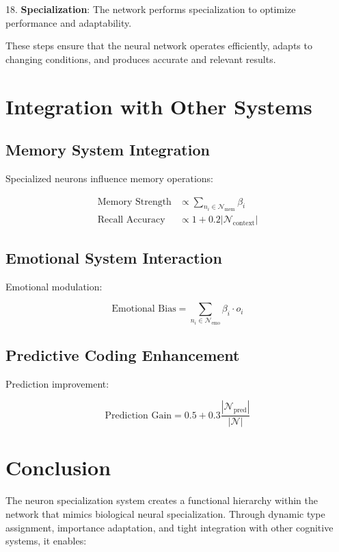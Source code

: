 \documentclass{article}
\begin{document}
18. \textbf{Specialization}: The network performs specialization to optimize performance and adaptability.

These steps ensure that the neural network operates efficiently, adapts to changing conditions, and produces accurate and relevant results.

\section{Integration with Other Systems}

\subsection{Memory System Integration}
Specialized neurons influence memory operations:

\begin{align}
\text{Memory Strength} &\propto \sum_{n_i \in \mathcal{N}_{\text{mem}}} \beta_i \\
\text{Recall Accuracy} &\propto 1 + 0.2|\mathcal{N}_{\text{context}}|
\end{align}

\subsection{Emotional System Interaction}
Emotional modulation:

\begin{equation}
\text{Emotional Bias} = \sum_{n_i \in \mathcal{N}_{\text{emo}}} \beta_i \cdot o_i
\end{equation}

\subsection{Predictive Coding Enhancement}
Prediction improvement:

\begin{equation}
\text{Prediction Gain} = 0.5 + 0.3\frac{|\mathcal{N}_{\text{pred}}|}{|\mathcal{N}|}
\end{equation}

\section{Conclusion}
The neuron specialization system creates a functional hierarchy within the network that mimics biological neural specialization. Through dynamic type assignment, importance adaptation, and tight integration with other cognitive systems, it enables:
\end{document}
